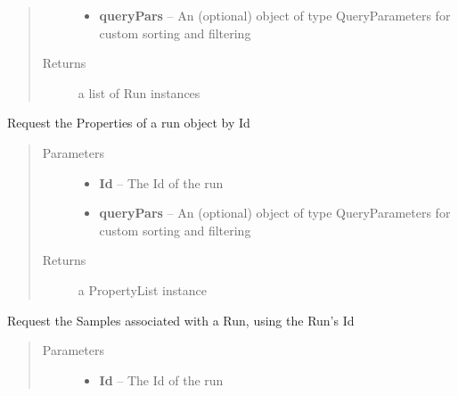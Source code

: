 \documentclass[letterpaper,10pt,english]{sphinxmanual}
\begin{document}
\begin{fulllineitems}
\begin{fulllineitems}
\begin{quote}
\begin{description}
\begin{itemize}
\item {} 
\textbf{queryPars} -- An (optional) object of type QueryParameters for custom sorting and filtering

\end{itemize}

\item[{Returns}] \leavevmode
a list of Run instances

\end{description}\end{quote}

\end{fulllineitems}


\begin{fulllineitems}
\label{Available modules:BaseSpacePy.api.BaseSpaceAPI.BaseSpaceAPI.getRunPropertiesById}
Request the Properties of a run object by Id
\begin{quote}\begin{description}
\item[{Parameters}] \leavevmode\begin{itemize}
\item {} 
\textbf{Id} -- The Id of the run

\item {} 
\textbf{queryPars} -- An (optional) object of type QueryParameters for custom sorting and filtering

\end{itemize}

\item[{Returns}] \leavevmode
a PropertyList instance

\end{description}\end{quote}

\end{fulllineitems}


\begin{fulllineitems}
\label{Available modules:BaseSpacePy.api.BaseSpaceAPI.BaseSpaceAPI.getRunSamplesById}
Request the Samples associated with a Run, using the Run's Id
\begin{quote}\begin{description}
\item[{Parameters}] \leavevmode\begin{itemize}
\item {} 
\textbf{Id} -- The Id of the run


\end{itemize}
\end{description}
\end{quote}
\end{fulllineitems}
\end{fulllineitems}
\end{document}
